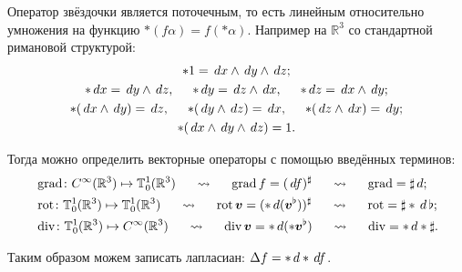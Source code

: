 Оператор звёздочки является поточечным, то есть линейным относительно умножения на функцию $*(f \alpha) = f(*\alpha)$. Например на $\mathbb{R}^3$ со стандартной римановой структурой:
\begin{gather*}
   	*1 = \, d x \wedge \, d y \wedge \, d z;
   	\\
   	*\, d x = \, d y \wedge \, d z, 
   	\hspace*{0.5 cm}
   	*\, d y = \, d z \wedge \, d x, 
   	\hspace*{0.5 cm}
   	*\, d z = \, d x \wedge \, d y;
   	\\
   	*(\, d x \wedge \, d y) = \, d z,
   	\hspace*{0.5 cm}
   	*(\, d y \wedge \, d z) = \, d x,
   	\hspace*{0.5 cm}
   	*(\, d z \wedge \, d x) = \, d y;
   	\\
   	*(\, d x \wedge \, d y \wedge \, d z) = 1.
\end{gather*}

Тогда можно определить векторные операторы с помощью введённых терминов:
\begin{align*}
   &\mathop{\mathrm{grad}}\nolimits \colon C^\infty(\mathbb{R}^3) \mapsto \mathbb{T}_0^1 (\mathbb{R}^3)
   \hspace*{0.5 cm} 
   \leadsto 
   \hspace*{0.5 cm}
   \mathop{\mathrm{grad}}\nolimits f = (\, d f)^\sharp 
   \hspace*{0.5 cm} 
   \leadsto 
   \hspace*{0.5 cm}
   \mathop{\mathrm{grad}}\nolimits = \sharp \, d;
   \\
   &\mathop{\mathrm{rot}}\nolimits \colon \mathbb{T}_0^1(\mathbb{R}^3) \mapsto \mathbb{T}_0^1(\mathbb{R}^3)
   \hspace*{0.5 cm} 
   \leadsto 
   \hspace*{0.5 cm}
   \mathop{\mathrm{rot}}\nolimits \mbox{\boldmath $v$} = (*\, d(\mbox{\boldmath $v$}^\flat))^\sharp
   \hspace*{0.5 cm} 
   \leadsto 
   \hspace*{0.5 cm}
   \mathop{\mathrm{rot}}\nolimits = \sharp * \, d \, \flat;
   \\
   &\mathop{\mathrm{div}}\nolimits \colon \mathbb{T}_0^1(\mathbb{R}^3) \mapsto C^\infty(\mathbb{R}^3)
   \hspace*{0.5 cm} 
   \leadsto 
   \hspace*{0.5 cm}
   \mathop{\mathrm{div}}\nolimits \mbox{\boldmath $v$} = *\, d(*\mbox{\boldmath $v$}^\flat)
   \hspace*{0.5 cm} 
   \leadsto 
   \hspace*{0.5 cm}
   \mathop{\mathrm{div}}\nolimits = * \, d * \sharp.
\end{align*}

Таким образом можем записать лапласиан: $\Delta f = *\, d * \, d f$.  
